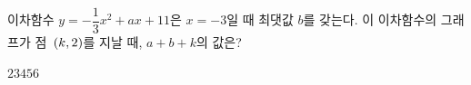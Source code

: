 \hspace*{2mm}\begin{minipage}[t]{\dimexpr\linewidth-2mm\relax}\vspace{0pt}
이차함수 $y=-\dfrac{1}{3}x^2+ax+11$은 $x=-3$일 때 최댓값 $b$를 갖는다. 이 이차함수의 그래프가 점~$(k{,}\mkern3mu 2)$를 지날 때, $a+b+k$의 값은? 
\begin{choices32}{$2$}{$3$}{$4$}{$5$}{$6$}\end{choices32}\end{minipage}
